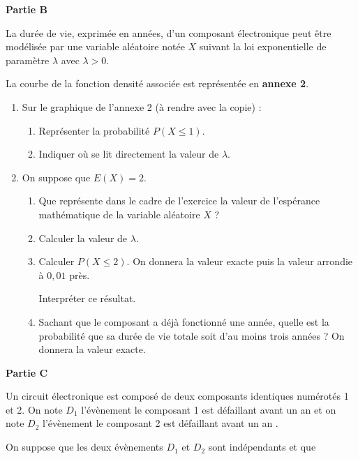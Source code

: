 \documentclass[12pt,french]{article}
\begin{document}
\begin{question}[subtitle={Antilles Guyane 2015}]
\bigskip

\textbf{Partie B}

\medskip

La durée de vie, exprimée en années, d'un composant électronique peut être
modélisée par une variable aléatoire notée $X$ suivant la loi exponentielle
de paramètre $\lambda$ avec $\lambda > 0$.

La courbe de la fonction densité associée est représentée en \textbf{annexe 2}.

\medskip

\begin{enumerate}
  \item Sur le graphique de l'annexe 2 (à rendre avec la copie) :
    \begin{enumerate}
      \item Représenter la probabilité $P(X \leqslant  1)$.
      \item Indiquer où se lit directement la valeur de $\lambda$.
    \end{enumerate}
  \item  On suppose que $E(X) = 2$.
    \begin{enumerate}
      \item Que représente dans le cadre de l'exercice la valeur de
        l'espérance mathématique de la variable aléatoire $X$ ?
      \item Calculer la valeur de $\lambda$.
      \item Calculer $P(X \leqslant 2)$. On donnera la valeur exacte puis la
        valeur arrondie à $0,01$ près.

        Interpréter ce résultat.
      \item Sachant que le composant a déjà fonctionné une année, quelle est
        la probabilité que sa durée de vie totale soit d'au moins trois
        années ? On donnera la valeur exacte.
    \end{enumerate}
\end{enumerate}

\bigskip

\textbf{Partie C}

\medskip

Un circuit électronique est composé de deux composants identiques numérotés 1 et 2.
On note $D_1$ l'évènement \og le composant 1 est défaillant avant un an
\fg{} et on note $D_2$ l'évènement \og le composant 2 est défaillant avant
un an \fg.

On suppose que les deux évènements $D_1$ et $D_2$ sont indépendants et que 


\end{question}
\end{document}
